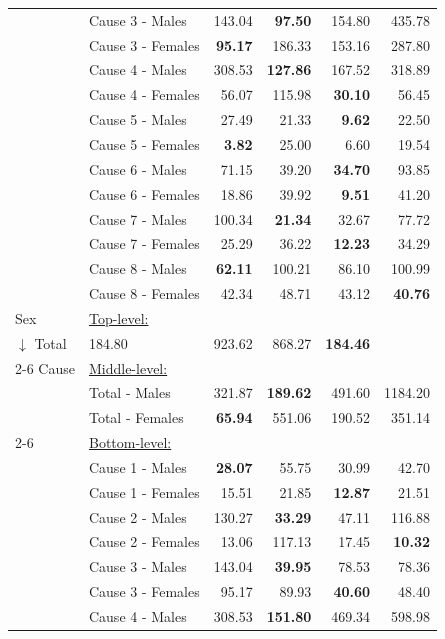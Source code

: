 \begin{center}
\begin{small}
\begin{longtable}{@{}llrrrr@{}}
& Cause 3 - Males & 143.04 & \textbf{97.50} & 154.80 & 435.78 \\
& Cause 3 - Females & \textbf{95.17} & 186.33 & 153.16 & 287.80 \\
& Cause 4 - Males & 308.53 & \textbf{127.86} & 167.52 & 318.89 \\
& Cause 4 - Females & 56.07 & 115.98 & \textbf{30.10} & 56.45 \\
& Cause 5 - Males & 27.49 & 21.33 & \textbf{9.62} & 22.50 \\
& Cause 5 - Females & \textbf{3.82} & 25.00 & 6.60 & 19.54 \\
& Cause 6 - Males & 71.15 & 39.20 & \textbf{34.70} & 93.85 \\
& Cause 6 - Females & 18.86 & 39.92 & \textbf{9.51} & 41.20 \\
& Cause 7 - Males & 100.34 & \textbf{21.34} & 32.67 & 77.72 \\
& Cause 7 - Females & 25.29 & 36.22 & \textbf{12.23} & 34.29 \\
& Cause 8 - Males & \textbf{62.11} & 100.21 & 86.10 & 100.99 \\
& Cause 8 - Females & 42.34 & 48.71 & 43.12 & \textbf{40.76} \\
\midrule
Sex & \multicolumn{5}{l}{\underline{Top-level:}}\\
$\downarrow$  Total & 184.80 & 923.62 & 868.27 & \textbf{184.46} \\
\cmidrule{2-6}
Cause & \multicolumn{5}{l}{\underline{Middle-level:}}\\
& Total - Males & 321.87 & \textbf{189.62} & 491.60 & 1184.20 \\
& Total - Females & \textbf{65.94} & 551.06 & 190.52 & 351.14 \\
\cmidrule{2-6}
& \multicolumn{5}{l}{\underline{Bottom-level:}}\\
& Cause 1 - Males & \textbf{28.07} & 55.75 & 30.99 & 42.70 \\
& Cause 1 - Females & 15.51 & 21.85 & \textbf{12.87} & 21.51 \\
& Cause 2 - Males & 130.27 & \textbf{33.29} & 47.11 & 116.88 \\
& Cause 2 - Females & 13.06 & 117.13 & 17.45 & \textbf{10.32} \\
& Cause 3 - Males & 143.04 & \textbf{39.95} & 78.53 & 78.36 \\
& Cause 3 - Females & 95.17 & 89.93 & \textbf{40.60} & 48.40 \\
& Cause 4 - Males & 308.53 & \textbf{151.80} & 469.34 & 598.98 \\

\end{longtable}
\end{small}
\end{center}
